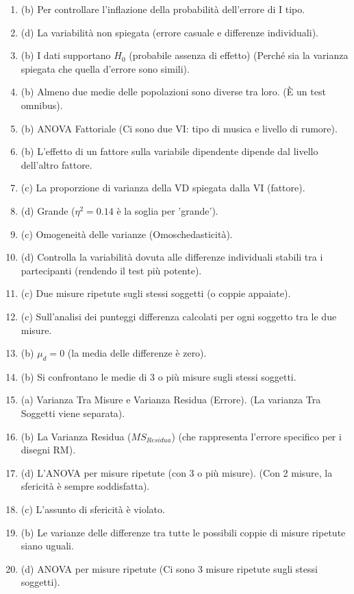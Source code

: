 \documentclass[12pt, a4paper]{article}
\newcommand{\Hnull}{H_0} %
\newcommand{\etasq}{\eta^2} %
\begin{document}
\begin{enumerate}[leftmargin=*, label=\arabic*.]
    \item (b) Per controllare l'inflazione della probabilità dell'errore di I tipo.
    \item (d) La variabilità non spiegata (errore casuale e differenze individuali).
    \item (b) I dati supportano $\Hnull$ (probabile assenza di effetto) (Perché sia la varianza spiegata che quella d'errore sono simili).
    \item (b) Almeno due medie delle popolazioni sono diverse tra loro. (È un test omnibus).
    \item (b) ANOVA Fattoriale (Ci sono due VI: tipo di musica e livello di rumore).
    \item (b) L'effetto di un fattore sulla variabile dipendente dipende dal livello dell'altro fattore.
    \item (c) La proporzione di varianza della VD spiegata dalla VI (fattore).
    \item (d) Grande ($\etasq = 0.14$ è la soglia per 'grande').
    \item (c) Omogeneità delle varianze (Omoschedasticità).
    \item (d) Controlla la variabilità dovuta alle differenze individuali stabili tra i partecipanti (rendendo il test più potente).
    \item (c) Due misure ripetute sugli stessi soggetti (o coppie appaiate).
    \item (c) Sull'analisi dei punteggi differenza calcolati per ogni soggetto tra le due misure.
    \item (b) $\mu_d = 0$ (la media delle differenze è zero).
    \item (b) Si confrontano le medie di 3 o più misure sugli stessi soggetti.
    \item (a) Varianza Tra Misure e Varianza Residua (Errore). (La varianza Tra Soggetti viene separata).
    \item (b) La Varianza Residua ($MS_{Residua}$) (che rappresenta l'errore specifico per i disegni RM).
    \item (d) L'ANOVA per misure ripetute (con 3 o più misure). (Con 2 misure, la sfericità è sempre soddisfatta).
    \item (c) L'assunto di sfericità è violato.
    \item (b) Le varianze delle differenze tra tutte le possibili coppie di misure ripetute siano uguali.
    \item (d) ANOVA per misure ripetute (Ci sono 3 misure ripetute sugli stessi soggetti).
\end{enumerate}
\end{document}
